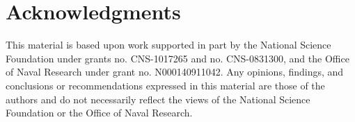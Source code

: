 \section*{Acknowledgments}

This material is based upon work supported in part by the National
Science Foundation under grants no. CNS-1017265 and no. CNS-0831300, and
the Office of Naval Research under grant no. N000140911042. Any
opinions, findings, and conclusions or recommendations expressed in this
material are those of the authors and do not necessarily reflect the
views of the National Science Foundation or the Office of Naval
Research.
